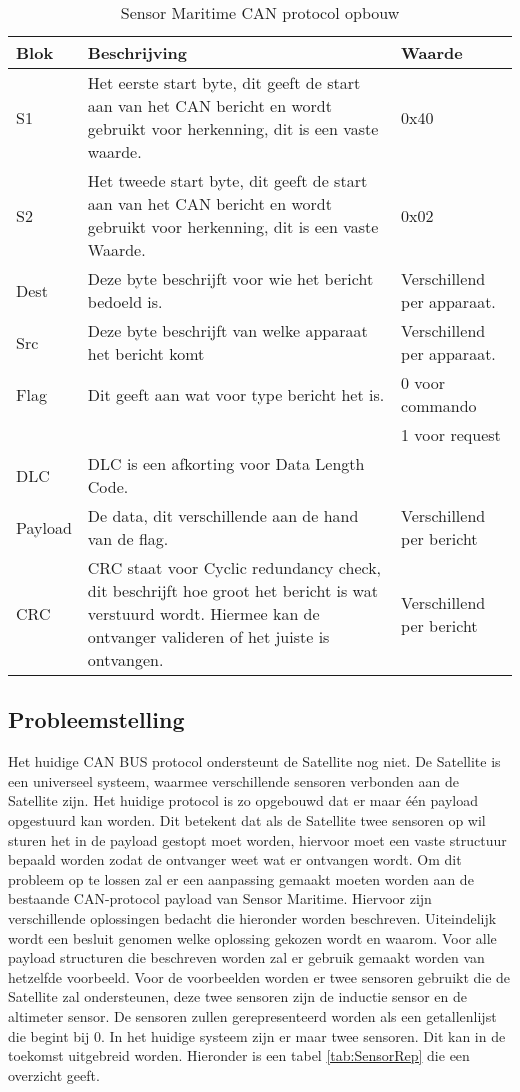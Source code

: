 \begin{table}[h!]
	\caption{Sensor Maritime CAN protocol opbouw}
	\label{tab:cansensorprotocol}
	\begin{tabular}{p{1.5cm}p{11.5cm}p{3cm}}
	\toprule
	\textbf{Blok} & \textbf{Beschrijving} & \textbf{Waarde}\\ \midrule
	S1		& Het eerste start byte, dit geeft de start aan van het CAN bericht en wordt gebruikt voor herkenning, dit is een vaste waarde.	& 0x40 \\
	S2		& Het tweede start byte, dit geeft de start aan van het CAN bericht en wordt gebruikt voor herkenning, dit is een vaste Waarde. & 0x02 \\
	Dest	& Deze byte beschrijft voor wie het bericht bedoeld is.		& Verschillend per apparaat. \\
	Src		& Deze byte beschrijft van welke apparaat het bericht komt	& Verschillend per apparaat.\\ 
	Flag	& Dit geeft aan wat voor type bericht het is.             & 0 voor commando \\ 
			& & 1 voor request \\ 
	DLC		& DLC is een afkorting voor Data Length Code.             & \\ 
	Payload	& De data, dit verschillende aan de hand van de flag. & Verschillend per bericht\\
	CRC		& CRC staat voor Cyclic redundancy check, dit beschrijft hoe groot het bericht is wat verstuurd wordt. Hiermee kan de ontvanger valideren of het juiste is ontvangen. & Verschillend per bericht\\ \bottomrule
	\end{tabular}
\end{table}

\newpage
\subsection{Probleemstelling}
Het huidige CAN BUS protocol ondersteunt de Satellite nog niet. De Satellite is een universeel systeem, waarmee verschillende sensoren verbonden aan de Satellite zijn. Het huidige protocol is zo opgebouwd dat er maar één payload opgestuurd kan worden. Dit betekent dat als de Satellite twee sensoren op wil sturen het in de payload gestopt moet worden, hiervoor moet een vaste structuur bepaald worden zodat de ontvanger weet wat er ontvangen wordt. Om dit probleem op te lossen zal er een aanpassing gemaakt moeten worden aan de bestaande CAN-protocol payload van Sensor Maritime. Hiervoor zijn verschillende oplossingen bedacht die hieronder worden beschreven. Uiteindelijk wordt een besluit genomen welke oplossing gekozen wordt en waarom. Voor alle payload structuren die beschreven worden zal er gebruik gemaakt worden van hetzelfde voorbeeld. Voor de voorbeelden worden er twee sensoren gebruikt die de Satellite zal ondersteunen, deze twee sensoren zijn de inductie sensor en de altimeter sensor. De sensoren zullen gerepresenteerd worden als een getallenlijst die begint bij 0. In het huidige systeem zijn er maar twee sensoren. Dit kan in de toekomst uitgebreid worden. Hieronder is een tabel \ref{tab:SensorRep} die een overzicht geeft.

